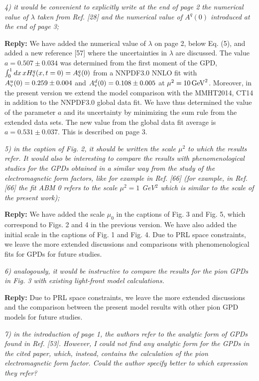 \documentclass[12pt]{article}
\begin{document}
{\it 4) it would be convenient to explicitly write at the end of page 2 the
numerical value of $\lambda$ taken from Ref. [28] and the numerical
value of $A^q(0)$ introduced at the end of page 3;}

{\bf Reply:} We have added the numerical value of $\lambda$ on page 2, below Eq. (5), and added a new reference [57] where the uncertainties in $\lambda$ are discussed. The value $a=0.507 \pm 0.034$ was determined from the first moment of the GPD, $\int_0^1 dx\, xH_{\rm v}^q(x,t=0)=A_{\rm v}^q(0)$ from a NNPDF3.0 NNLO fit with $A_{\rm v}^u(0)=0.259\pm0.004$ and $A_{\rm v}^d(0)=0.108\pm0.005$ at $\mu^2=10\,{\rm GeV}^2$.  Moreover, in the present version we extend the model comparison with the MMHT2014, CT14 in addition to the NNPDF3.0 global data  fit. We have thus determined the value of the parameter $a$ and its uncertainty by minimizing the sum rule from the extended data sets.  The new value from the global data fit average is $a = 0.531 \pm 0.037$. This is described on page 3.


{\it 5) in the caption of Fig. 2, it should be written the scale $\mu^2$ to
which the results refer. It would also be interesting to compare the
results with phenomenological studies for the GPDs obtained in a
similar way from the study of the electromagnetic form factors, like
for example in Ref. [66] (for example, in Ref. [66] the fit ABM 0
refers to the scale $\mu^2=1$ GeV$^2$ which is similar to the scale of
the present work);}

{\bf Reply:} We have added the scale $\mu_0$ in the captions of  Fig. 3 and Fig. 5, which correspond to Figs. 2 and 4 in  the previous version. We have also added the initial scale in the captions of Fig. 1 and Fig. 4.  Due to PRL space constraints, we leave the more extended discussions and comparisons with phenomenological fits for GPDs for future studies.


{\it 6) analogously, it would be instructive to compare the results for the
pion GPDs in Fig. 3 with existing light-front model calculations.}

{\bf Reply:}    Due to PRL space constraints, we leave the more extended discussions and the comparison between the present model results with other pion GPD models for future studies.


{\it 7) in the introduction of page 1, the authors refer to the analytic
form of GPDs found in Ref. [53]. However, I could not find any
analytic form for the GPDs in the cited paper, which, instead,
contains the calculation of the pion electromagnetic form factor.
Could the author specify better to which expression they refer?}
\end{document}
